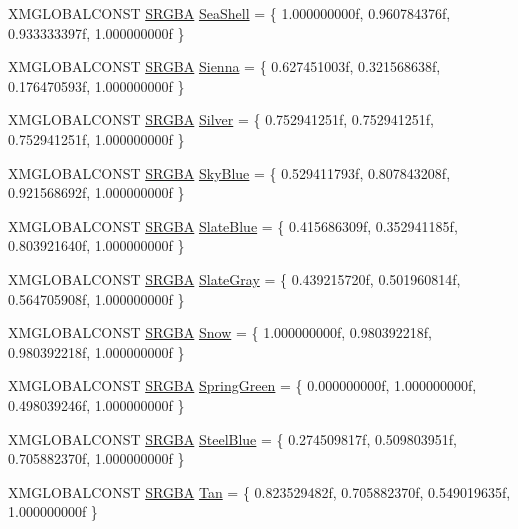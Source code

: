 \begin{DoxyCompactItemize}
X\+M\+G\+L\+O\+B\+A\+L\+C\+O\+N\+ST \hyperlink{structmage_1_1_s_r_g_b_a}{S\+R\+G\+BA} \hyperlink{namespacemage_1_1color_aa8a0da85ed6da88876eaeb2b89582b3f}{Sea\+Shell} = \{ 1.\+000000000f, 0.\+960784376f, 0.\+933333397f, 1.\+000000000f \}
\item 
X\+M\+G\+L\+O\+B\+A\+L\+C\+O\+N\+ST \hyperlink{structmage_1_1_s_r_g_b_a}{S\+R\+G\+BA} \hyperlink{namespacemage_1_1color_a27eddb02f837f52a00386e4333e5eb85}{Sienna} = \{ 0.\+627451003f, 0.\+321568638f, 0.\+176470593f, 1.\+000000000f \}
\item 
X\+M\+G\+L\+O\+B\+A\+L\+C\+O\+N\+ST \hyperlink{structmage_1_1_s_r_g_b_a}{S\+R\+G\+BA} \hyperlink{namespacemage_1_1color_acebb20ebe9cd29655857f24b697a30b9}{Silver} = \{ 0.\+752941251f, 0.\+752941251f, 0.\+752941251f, 1.\+000000000f \}
\item 
X\+M\+G\+L\+O\+B\+A\+L\+C\+O\+N\+ST \hyperlink{structmage_1_1_s_r_g_b_a}{S\+R\+G\+BA} \hyperlink{namespacemage_1_1color_a59cad81a80e8dce3541dd54e603cb63c}{Sky\+Blue} = \{ 0.\+529411793f, 0.\+807843208f, 0.\+921568692f, 1.\+000000000f \}
\item 
X\+M\+G\+L\+O\+B\+A\+L\+C\+O\+N\+ST \hyperlink{structmage_1_1_s_r_g_b_a}{S\+R\+G\+BA} \hyperlink{namespacemage_1_1color_a604b4410edf3b2bda414691b3bb877c2}{Slate\+Blue} = \{ 0.\+415686309f, 0.\+352941185f, 0.\+803921640f, 1.\+000000000f \}
\item 
X\+M\+G\+L\+O\+B\+A\+L\+C\+O\+N\+ST \hyperlink{structmage_1_1_s_r_g_b_a}{S\+R\+G\+BA} \hyperlink{namespacemage_1_1color_aaf014e73a6fb5690de0ee9a0f49a7a97}{Slate\+Gray} = \{ 0.\+439215720f, 0.\+501960814f, 0.\+564705908f, 1.\+000000000f \}
\item 
X\+M\+G\+L\+O\+B\+A\+L\+C\+O\+N\+ST \hyperlink{structmage_1_1_s_r_g_b_a}{S\+R\+G\+BA} \hyperlink{namespacemage_1_1color_a5d87c66b53439e6b08c4f40c522e3552}{Snow} = \{ 1.\+000000000f, 0.\+980392218f, 0.\+980392218f, 1.\+000000000f \}
\item 
X\+M\+G\+L\+O\+B\+A\+L\+C\+O\+N\+ST \hyperlink{structmage_1_1_s_r_g_b_a}{S\+R\+G\+BA} \hyperlink{namespacemage_1_1color_a51f0437c183d7b1488eaaa71f4790b0c}{Spring\+Green} = \{ 0.\+000000000f, 1.\+000000000f, 0.\+498039246f, 1.\+000000000f \}
\item 
X\+M\+G\+L\+O\+B\+A\+L\+C\+O\+N\+ST \hyperlink{structmage_1_1_s_r_g_b_a}{S\+R\+G\+BA} \hyperlink{namespacemage_1_1color_a50269302244cbd567048900ee80b9c28}{Steel\+Blue} = \{ 0.\+274509817f, 0.\+509803951f, 0.\+705882370f, 1.\+000000000f \}
\item 
X\+M\+G\+L\+O\+B\+A\+L\+C\+O\+N\+ST \hyperlink{structmage_1_1_s_r_g_b_a}{S\+R\+G\+BA} \hyperlink{namespacemage_1_1color_ad1e6957f59027fe43fb973ded05cde79}{Tan} = \{ 0.\+823529482f, 0.\+705882370f, 0.\+549019635f, 1.\+000000000f \}

\end{DoxyCompactItemize}
